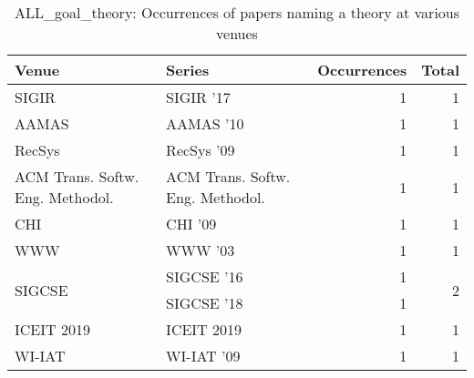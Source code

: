 \begin{table*}[t]
\begin{tabular}{llrr}
Venue & Series & Occurrences & Total\\\hline
\multirow{1}{*}{SIGIR } & SIGIR '17 & 1 & \multirow{1}{*}{1}\\
\multirow{1}{*}{AAMAS } & AAMAS '10 & 1 & \multirow{1}{*}{1}\\
\multirow{1}{*}{RecSys } & RecSys '09 & 1 & \multirow{1}{*}{1}\\
\multirow{1}{*}{ACM Trans. Softw. Eng. Methodol.} & ACM Trans. Softw. Eng. Methodol. & 1 & \multirow{1}{*}{1}\\
\multirow{1}{*}{CHI } & CHI '09 & 1 & \multirow{1}{*}{1}\\
\multirow{1}{*}{WWW } & WWW '03 & 1 & \multirow{1}{*}{1}\\
\multirow{2}{*}{SIGCSE } & SIGCSE '16 & 1 & \multirow{2}{*}{2}\\
& SIGCSE '18 & 1 &\\
\multirow{1}{*}{ICEIT 2019} & ICEIT 2019 & 1 & \multirow{1}{*}{1}\\
\multirow{1}{*}{WI-IAT } & WI-IAT '09 & 1 & \multirow{1}{*}{1}\\
\end{tabular}
\caption{ALL\_goal\_theory: Occurrences of papers naming a theory at various venues}
\end{table*}